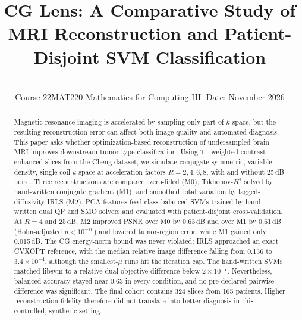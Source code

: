 \documentclass[conference,a4paper]{IEEEtran}
\begin{document}
\title{CG Lens: A Comparative Study of MRI Reconstruction and Patient-Disjoint SVM Classification}

\author{%
\and
{}
\\[0.7em]
{\normalsize Course 22MAT220 Mathematics for Computing III \quad$\cdot$\quad Date: November 2026}
}

\maketitle

\begin{abstract}
Magnetic resonance imaging is accelerated by sampling only part of $k$-space, but the resulting reconstruction error can affect both image quality and automated diagnosis. This paper asks whether optimization-based reconstruction of undersampled brain MRI improves downstream tumor-type classification. Using T1-weighted contrast-enhanced slices from the Cheng dataset, we simulate conjugate-symmetric, variable-density, single-coil $k$-space at acceleration factors $R=2,4,6,8$, with and without 25\,dB noise. Three reconstructions are compared: zero-filled (M0), Tikhonov-$H^1$ solved by hand-written conjugate gradient (M1), and smoothed total variation by lagged-diffusivity IRLS (M2). PCA features feed class-balanced SVMs trained by hand-written dual QP and SMO solvers and evaluated with patient-disjoint cross-validation. At $R=4$ and 25\,dB, M2 improved PSNR over M0 by 0.63\,dB and over M1 by 0.61\,dB (Holm-adjusted $p<10^{-10}$) and lowered tumor-region error, while M1 gained only 0.015\,dB. The CG energy-norm bound was never violated; IRLS approached an exact CVXOPT reference, with the median relative image difference falling from 0.136 to $3.4\times10^{-4}$, although the smallest-$\mu$ runs hit the iteration cap. The hand-written SVMs matched libsvm to a relative dual-objective difference below $2\times10^{-7}$. Nevertheless, balanced accuracy stayed near 0.63 in every condition, and no pre-declared pairwise difference was significant. The final cohort contains 324 slices from 165 patients. Higher reconstruction fidelity therefore did not translate into better diagnosis in this controlled, synthetic setting.
\end{abstract}
\end{document}
